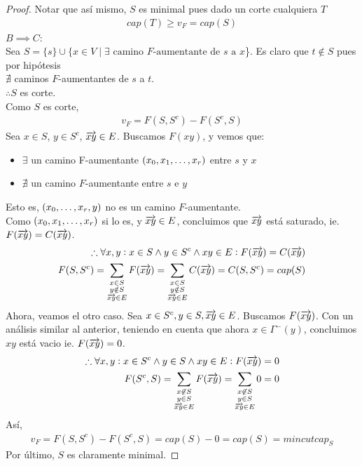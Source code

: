 \begin{proof}
Notar que así mismo, $S$ es minimal pues dado un corte cualquiera $T$\begin{align}
    cap(T) \ge v_F = cap(S)
\end{align}
$B \implies C:$\\
Sea $S = \{s\} \cup \{x \in V \mid \exists \text{ camino $F$-aumentante de $s$ a $x$}$\}.
Es claro que $t \notin S$ pues por hipótesis \\$\nexists$ caminos $F$-aumentantes de $s$ a $t$.\\
$\therefore S$ es corte.\\
Como $S$ es corte,
\begin{align}
    v_F = F(S, S^c) - F(S^c, S)
\end{align}
Sea $x \in S$, $y \in S^c$, $\overrightarrow{xy} \in E$. Buscamos $F(xy)$, y vemos que:
\begin{itemize}
    \item $\exists$ un camino F-aumentante $(x_0, x_1,\mathellipsis, x_r)$ entre $s$ y $x$
    \item $\nexists$ un camino $F$-aumentante entre $s$ e $y$
\end{itemize}
Esto es, $(x_0, \mathellipsis, x_r, y)$ no es un camino $F$-aumentante.\\
Como $(x_0, x_1, \mathellipsis, x_r)$ si lo es, y $\overrightarrow{xy} \in E$, concluimos que $\overrightarrow{xy}$ está saturado, ie. \\$F(\overrightarrow{xy}) = C(\overrightarrow{xy})$.
\begin{align}
    \therefore \forall x,y: x \in S \wedge y \in S^c \wedge xy \in E : F(\overrightarrow{xy}) = C(\overrightarrow{xy})\\
    F(S, S^c) = \sum_{\substack{x\in S\\ y \notin S \\\overrightarrow{xy} \in E}} F(\overrightarrow{xy}) = \sum_{\substack{x\in S\\ y \notin S\\ \overrightarrow{xy} \in E}} C(\overrightarrow{xy}) = C(S, S^c) = cap(S)\\
\end{align}
Ahora, veamos el otro caso. Sea $x \in S^c, y \in S, \overrightarrow{xy} \in E$. Buscamos $F(\overrightarrow{xy})$. Con un análisis similar al anterior, teniendo en cuenta que ahora $x\in \Gamma^-(y)$, concluimos $xy$ está vacio ie. $F(\overrightarrow{xy}) = 0$.
\begin{align}
    \therefore \forall x, y : x \in S^c \wedge y \in S \wedge xy \in E : F(\overrightarrow{xy}) = 0\\
    F(S^c, S) = \sum_{\substack{x\not\in S\\ y \in S\\ \overrightarrow{xy} \in E}} F(\overrightarrow{xy}) = \sum_{\substack{x\not\in S\\ y \in S\\ \overrightarrow{xy} \in E}} 0 = 0
\end{align}
Así,
\begin{align}
v_F = F(S, S^c) - F(S^c, S) = cap(S) - 0 = cap(S) = mincutcap_S
\end{align}
Por último, $S$ es claramente minimal.


\end{proof}
